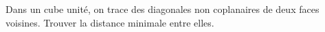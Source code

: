 Dans un cube unité, on trace des diagonales non coplanaires de deux faces voisines. Trouver la distance minimale entre elles.
